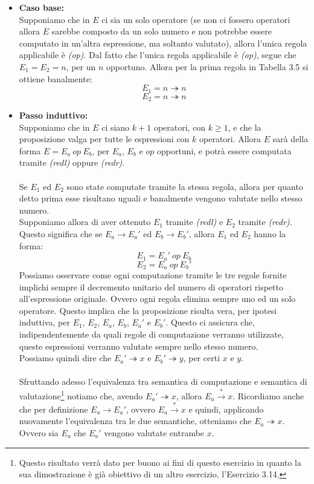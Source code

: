     \begin{itemize}
        \item \textbf{Caso base:}\\
            Supponiamo che in $E$ ci sia un solo operatore (se non ci fossero operatori allora $E$ sarebbe composto da un solo numero e non potrebbe essere computato in un'altra espressione, ma soltanto valutato), allora l'unica regola applicabile è \textit{(op)}. Dal fatto che l'unica regola applicabile è \textit{(op)}, segue che $E_1=E_2=n$, per un $n$ opportuno. Allora per la prima regola in Tabella 3.5 si ottiene banalmente:
            $$E_1 = n \twoheadrightarrow n$$
            $$E_2 = n \twoheadrightarrow n$$
        \item \textbf{Passo induttivo:}\\
            Supponiamo che in $E$ ci siano $k+1$ operatori, con $k \geq 1$, e che la proposizione valga per tutte le espressioni con $k$ operatori. Allora $E$ sarà della forma $E=E_a\ op\ E_b$, per $E_a$, $E_b$ e $op$ opportuni, e potrà essere computata tramite \textit{(redl)} oppure \textit{(redr)}.\\
            \\
            Se $E_1$ ed $E_2$ sono state computate tramite la stessa regola, allora per quanto detto prima esse risultano uguali e banalmente vengono valutate nello stesso numero.\\
            Supponiamo allora di aver ottenuto $E_1$ tramite \textit{(redl)} e $E_2$ tramite \textit{(redr)}. Questo significa che se $E_a \rightarrow E_a'$ ed $E_b \rightarrow E_b'$, allora $E_1$ ed $E_2$ hanno la forma:
            $$E_1 = E_a'\ op\ E_b$$
            $$E_2 = E_a\ op\ E_b'$$
            Possiamo osservare come ogni computazione tramite le tre regole fornite implichi sempre il decremento unitario del numero di operatori rispetto all'espressione originale. Ovvero ogni regola elimina sempre uno ed un solo operatore. Questo implica che la proposizione risulta vera, per ipotesi induttiva, per $E_1$, $E_2$, $E_a$, $E_b$, $E_a'$ e $E_b'$. Questo ci assicura che, indipendentemente da quali regole di computazione verranno utilizzate, queste espressioni verranno valutate sempre nello stesso numero.\\
            Possiamo quindi dire che $E_a' \twoheadrightarrow x$ e $E_b' \twoheadrightarrow y$, per certi $x$ e $y$.\\
            \\
            Sfruttando adesso l'equivalenza tra semantica di computazione e semantica di valutazione\footnote{Questo risultato verrà dato per buono ai fini di questo esercizio in quanto la sua dimostrazione è già obiettivo di un altro esercizio, l'Esercizio 3.14.} notiamo che, avendo $E_a' \twoheadrightarrow x$, allora $E_a \xrightarrow{*} x$. Ricordiamo anche che per definizione $E_a \rightarrow E_a'$, ovvero $E_a \xrightarrow{*} x$ e quindi, applicando nuovamente l'equivalenza tra le due semantiche, otteniamo che $E_a \twoheadrightarrow x$. Ovvero sia $E_a$ che $E_a'$ vengono valutate entrambe $x$.\\

\end{itemize}

